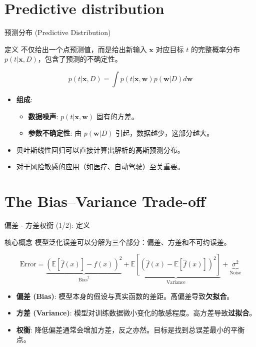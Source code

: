 \documentclass[12pt, aspectratio=169]{beamer}
\newcommand{\bw}{\mathbf{w}}
\newcommand{\bx}{\mathbf{x}}
\newcommand{\E}{\mathbb{E}}
\begin{document}
\section{Predictive distribution}
\begin{frame}{预测分布 (Predictive Distribution)}
    \begin{block}{定义}
        不仅给出一个点预测值，而是给出新输入 $\bx$ 对应目标 $t$ 的完整概率分布 $p(t|\bx, D)$，包含了预测的不确定性。
    \end{block}
    
    \begin{equation*}
        p(t|\bx, D) = \int p(t|\bx, \bw) p(\bw|D) d\bw
    \end{equation*}
    
    \vspace{0.2cm}
    \begin{itemize}
        \item \textbf{组成}:
        \begin{itemize}
            \item \textbf{数据噪声}: $p(t|\bx, \bw)$ 固有的方差。
            \item \textbf{参数不确定性}: 由 $p(\bw|D)$ 引起，数据越少，这部分越大。
        \end{itemize}
        \item 贝叶斯线性回归可以直接计算出解析的高斯预测分布。
        \item 对于风险敏感的应用（如医疗、自动驾驶）至关重要。
    \end{itemize}
\end{frame}

\section{The Bias–Variance Trade-off}
\begin{frame}{偏差 - 方差权衡 (1/2): 定义}
    \begin{block}{核心概念}
        模型泛化误差可以分解为三个部分：偏差、方差和不可约误差。
    \end{block}
    
    \begin{equation*}
        \text{Error} = \underbrace{(\E[\hat{f}(x)] - f(x))^2}_{\text{Bias}^2} + \underbrace{\E[(\hat{f}(x) - \E[\hat{f}(x)])^2]}_{\text{Variance}} + \underbrace{\sigma^2}_{\text{Noise}}
    \end{equation*}
    
    \vspace{0.2cm}
    \begin{itemize}
        \item \textbf{偏差 (Bias)}: 模型本身的假设与真实函数的差距。高偏差导致\textbf{欠拟合}。
        \item \textbf{方差 (Variance)}: 模型对训练数据微小变化的敏感程度。高方差导致\textbf{过拟合}。
        \item \textbf{权衡}: 降低偏差通常会增加方差，反之亦然。目标是找到总误差最小的平衡点。
    \end{itemize}
\end{frame}
\end{document}
